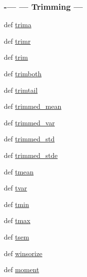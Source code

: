 \begin{DoxyCompactItemize}
\begin{DoxyCompactList}
 \subsubsection*{-\/--- --- Trimming --- }\end{DoxyCompactList}\item 
def \hyperlink{namespacescipy_1_1stats_1_1mstats__basic_aa8bc6d190ac09e8273a74d7118b4c03d}{trima}
\item 
def \hyperlink{namespacescipy_1_1stats_1_1mstats__basic_a0e92cd523a5acfec8068e820f3448d4a}{trimr}
\item 
def \hyperlink{namespacescipy_1_1stats_1_1mstats__basic_afcc09d341adba1a214e12b2bdfa03006}{trim}
\item 
def \hyperlink{namespacescipy_1_1stats_1_1mstats__basic_a793e24a1f37685da69a1dd2824d95754}{trimboth}
\item 
def \hyperlink{namespacescipy_1_1stats_1_1mstats__basic_afe3901ec673ef822046e8c336a8a7dcc}{trimtail}
\item 
def \hyperlink{namespacescipy_1_1stats_1_1mstats__basic_a15db28a26dccc83bf37151dd67d9b24f}{trimmed\+\_\+mean}
\item 
def \hyperlink{namespacescipy_1_1stats_1_1mstats__basic_a692d832dd10a55f108f6c440e0c3bcfc}{trimmed\+\_\+var}
\item 
def \hyperlink{namespacescipy_1_1stats_1_1mstats__basic_ab7788ad0a4a852b254eb25735abc712b}{trimmed\+\_\+std}
\item 
def \hyperlink{namespacescipy_1_1stats_1_1mstats__basic_aed45a179f5b6887b15c17b0be14cc0ea}{trimmed\+\_\+stde}
\item 
def \hyperlink{namespacescipy_1_1stats_1_1mstats__basic_a972acf82d16f88238d82e8995d383f0e}{tmean}
\item 
def \hyperlink{namespacescipy_1_1stats_1_1mstats__basic_a67a9bf3969af8f712c88961d45c0321d}{tvar}
\item 
def \hyperlink{namespacescipy_1_1stats_1_1mstats__basic_a8cc02fc5b655b98e1ea1414263d4f60e}{tmin}
\item 
def \hyperlink{namespacescipy_1_1stats_1_1mstats__basic_afd888de96ceba3bd0b229a2e00e0b794}{tmax}
\item 
def \hyperlink{namespacescipy_1_1stats_1_1mstats__basic_a703e95a53bbc553eb93a94e213ec6dab}{tsem}
\item 
def \hyperlink{namespacescipy_1_1stats_1_1mstats__basic_af626a7bcdf03bca103c4cfa8ca039689}{winsorize}
\item 
def \hyperlink{namespacescipy_1_1stats_1_1mstats__basic_a7fad9e56f9a55c4181e6ca955d236532}{moment}
\begin{DoxyCompactList}\small\item\em 


\end{DoxyCompactList}
\end{DoxyCompactItemize}
